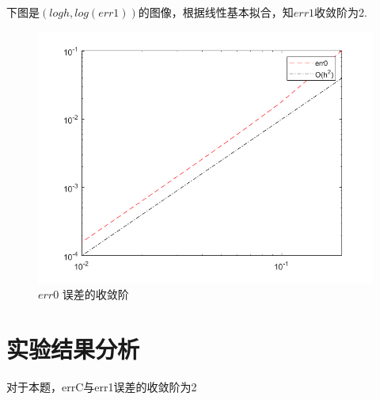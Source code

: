 \documentclass{article}
\begin{document}
\newpage
下图是$(logh,log(err1))$的图像，根据线性基本拟合，知$err1$收敛阶为2.
\begin{figure}[H]
\centering
\includegraphics[scale=0.5]{err0.png}
\caption{\label{err0}$err0$ 误差的收敛阶}
\end{figure}


\section{实验结果分析}
对于本题，errC与err1误差的收敛阶为2
\end{document}
